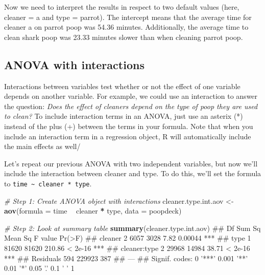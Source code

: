 \documentclass[]{book}
\newenvironment{Shaded}{\begin{snugshade}}{\end{snugshade}}
\newcommand{\KeywordTok}[1]{\textcolor[rgb]{0.13,0.29,0.53}{\textbf{#1}}}
\newcommand{\DataTypeTok}[1]{\textcolor[rgb]{0.13,0.29,0.53}{#1}}
\newcommand{\StringTok}[1]{\textcolor[rgb]{0.31,0.60,0.02}{#1}}
\newcommand{\CommentTok}[1]{\textcolor[rgb]{0.56,0.35,0.01}{\textit{#1}}}
\newcommand{\OperatorTok}[1]{\textcolor[rgb]{0.81,0.36,0.00}{\textbf{#1}}}
\newcommand{\NormalTok}[1]{#1}
\theoremstyle{definition}
\theoremstyle{definition}
\theoremstyle{remark}
\begin{document}
Now we need to interpret the results in respect to two default values
(here, cleaner = a and type = parrot). The intercept means that the
average time for cleaner a on parrot poop was 54.36 minutes.
Additionally, the average time to clean shark poop was 23.33 minutes
slower than when cleaning parrot poop.

\subsection{ANOVA with interactions}\label{anova-with-interactions}

Interactions between variables test whether or not the effect of one
variable depends on another variable. For example, we could use an
interaction to answer the question: \emph{Does the effect of cleaners
depend on the type of poop they are used to clean?} To include
interaction terms in an ANOVA, just use an asterix (*) instead of the
plus (+) between the terms in your formula. Note that when you include
an interaction term in a regression object, R will automatically include
the main effects as well/

Let's repeat our previous ANOVA with two independent variables, but now
we'll include the interaction between cleaner and type. To do this,
we'll set the formula to
\texttt{time\ \textasciitilde{}\ cleaner\ *\ type}.

\begin{Shaded}
\begin{Highlighting}[]
\CommentTok{# Step 1: Create ANOVA object with interactions}
\NormalTok{cleaner.type.int.aov <-}\StringTok{ }\KeywordTok{aov}\NormalTok{(}\DataTypeTok{formula =}\NormalTok{ time }\OperatorTok{~}\StringTok{ }\NormalTok{cleaner }\OperatorTok{*}\StringTok{ }\NormalTok{type,}
                          \DataTypeTok{data =}\NormalTok{ poopdeck)}

\CommentTok{# Step 2: Look at summary table}
\KeywordTok{summary}\NormalTok{(cleaner.type.int.aov)}
\NormalTok{##               Df Sum Sq Mean Sq F value  Pr(>F)    }
\NormalTok{## cleaner        2   6057    3028    7.82 0.00044 ***}
\NormalTok{## type           1  81620   81620  210.86 < 2e-16 ***}
\NormalTok{## cleaner:type   2  29968   14984   38.71 < 2e-16 ***}
\NormalTok{## Residuals    594 229923     387                    }
\NormalTok{## ---}
\NormalTok{## Signif. codes:  0 '***' 0.001 '**' 0.01 '*' 0.05 '.' 0.1 ' ' 1}
\end{Highlighting}
\end{Shaded}
\end{document}
